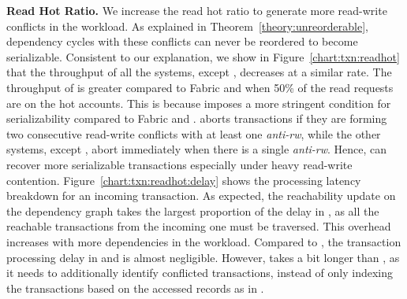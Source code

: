 \textbf{Read Hot Ratio.}
We increase the read hot ratio to generate more read-write conflicts in the workload. 
As explained in Theorem~\ref{theory:unreorderable}, dependency cycles with 
these conflicts can never be reordered to become serializable. 
Consistent to our explanation, we show in Figure~\ref{chart:txn:readhot} that the throughput of all the systems, except {\fsS}, decreases at a similar rate. 
The throughput of {\fsS} is greater compared to Fabric and {\fsL} when 50\% of the read requests are on the hot accounts. 
This is because {\fsS} imposes a more stringent condition for serializability compared to Fabric and {\fsL}.
{\fsS} aborts transactions if they are forming two consecutive read-write conflicts with at least one \textit{anti-rw}, while the other systems, except {\fsF}, abort immediately when there is a single \textit{anti-rw}. 
Hence, {\fsS} can recover more serializable transactions especially under heavy read-write contention. 
Figure~\ref{chart:txn:readhot:delay} shows the processing latency breakdown for an incoming transaction.
As expected, the reachability update on the dependency graph takes the largest proportion of the delay in {\fsF}, as all the reachable transactions from the incoming one must be traversed.
This overhead increases with more dependencies in the workload. 
Compared to {\fsF}, the transaction processing delay in {\fsS} and {\fsP} is almost negligible.
However, {\fsS} takes a bit longer than {\fsP}, as it needs to additionally identify conflicted transactions, instead of only indexing the transactions based on the accessed records as in {\fsP}. 

